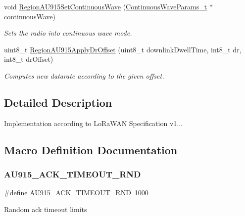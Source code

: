 \begin{DoxyCompactItemize}
void \hyperlink{group__REGIONAU915_gae8d539bbf21ee45777245dc1467fa07a}{Region\+A\+U915\+Set\+Continuous\+Wave} (\hyperlink{group__REGION_gaf39bb5ba06921139c6d17f88a8d518cd}{Continuous\+Wave\+Params\+\_\+t} $\ast$continuous\+Wave)
\begin{DoxyCompactList}\small\item\em Sets the radio into continuous wave mode. \end{DoxyCompactList}\item 
uint8\+\_\+t \hyperlink{group__REGIONAU915_gacdcc572470d582ce82ca60df7ffe37b0}{Region\+A\+U915\+Apply\+Dr\+Offset} (uint8\+\_\+t downlink\+Dwell\+Time, int8\+\_\+t dr, int8\+\_\+t dr\+Offset)
\begin{DoxyCompactList}\small\item\em Computes new datarate according to the given offset. \end{DoxyCompactList}\end{DoxyCompactItemize}


\subsection{Detailed Description}
Implementation according to Lo\+Ra\+W\+AN Specification v1... 

\subsection{Macro Definition Documentation}
\mbox{\label{group__REGIONAU915_ga093d31ebddca807195cbe6c6144258fa}} 
\subsubsection{\texorpdfstring{A\+U915\+\_\+\+A\+C\+K\+\_\+\+T\+I\+M\+E\+O\+U\+T\+\_\+\+R\+ND}{AU915\_ACK\_TIMEOUT\_RND}}
{\footnotesize\ttfamily \#define A\+U915\+\_\+\+A\+C\+K\+\_\+\+T\+I\+M\+E\+O\+U\+T\+\_\+\+R\+ND~1000}

Random ack timeout limits \mbox{\label{group__REGIONAU915_ga3fc2d9d63bcd48b926612b12eaa81971}} 
